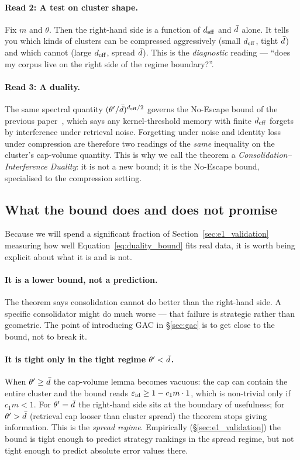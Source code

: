\paragraph{Read 2: A test on cluster shape.} Fix $m$ and $\theta$. Then
the right-hand side is a function of ${d_{\mathrm{eff}}}$ and $\bar{d}$ alone. It tells
you which kinds of clusters can be compressed aggressively (small
${d_{\mathrm{eff}}}$, tight $\bar{d}$) and which cannot (large ${d_{\mathrm{eff}}}$, spread
$\bar{d}$). This is the \emph{diagnostic} reading --- ``does my corpus live
on the right side of the regime boundary?''.

\paragraph{Read 3: A duality.} The same spectral quantity
$(\theta'/\bar{d})^{{d_{\mathrm{eff}}}/2}$ governs the No-Escape bound of the
previous paper~\cite{priceOfMeaning2026}, which says any kernel-threshold
memory with finite ${d_{\mathrm{eff}}}$ forgets by interference under retrieval
noise. Forgetting under noise and identity loss under compression are
therefore two readings of the \emph{same} inequality on the cluster's
cap-volume quantity. This is why we call the theorem a
\emph{Consolidation--Interference Duality}: it is not a new bound; it is
the No-Escape bound, specialised to the compression setting.

\subsection{What the bound does and does not promise}
\label{sec:duality:caveats}

Because we will spend a significant fraction of Section~\ref{sec:e1_validation}
measuring how well Equation~\eqref{eq:duality_bound} fits real data,
it is worth being explicit about what it is and is not.

\paragraph{It is a lower bound, not a prediction.} The theorem says
consolidation cannot do better than the right-hand side. A specific
consolidator might do much worse --- that failure is strategic rather
than geometric. The point of introducing GAC in \S\ref{sec:gac} is to
get close to the bound, not to break it.

\paragraph{It is tight only in the tight regime $\theta' < \bar{d}$.}
When $\theta' \geq \bar{d}$ the cap-volume lemma becomes vacuous: the cap
can contain the entire cluster and the bound reads
$\varepsilon_{\mathrm{id}} \geq 1 - c_1 m \cdot 1$, which is non-trivial only
if $c_1 m < 1$. For $\theta' = \bar{d}$ the right-hand side sits at the
boundary of usefulness; for $\theta' > \bar{d}$ (retrieval cap looser than
cluster spread) the theorem stops giving information. This is the
\emph{spread regime}. Empirically (\S\ref{sec:e1_validation}) the bound
is tight enough to predict strategy rankings in the spread regime, but
not tight enough to predict absolute error values there.

